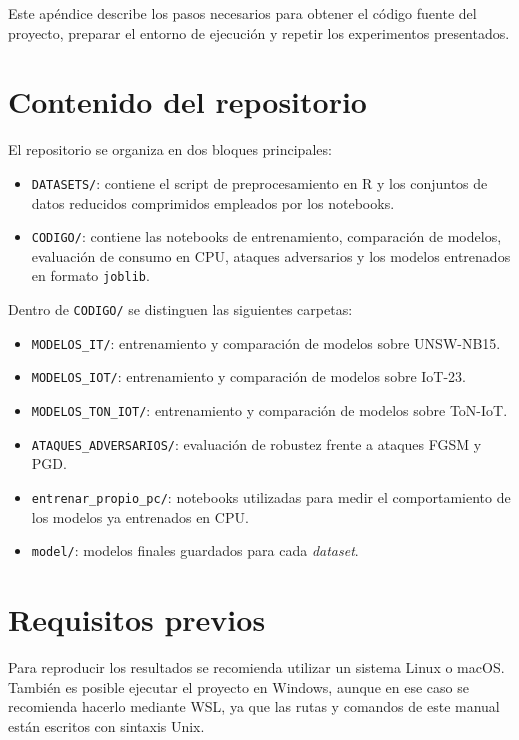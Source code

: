 Este apéndice describe los pasos necesarios para obtener el código fuente del proyecto, preparar el entorno de ejecución y repetir los experimentos presentados.

\section{Contenido del repositorio}

El repositorio se organiza en dos bloques principales:

\begin{itemize}
    \item \texttt{DATASETS/}: contiene el script de preprocesamiento en R y los conjuntos de datos reducidos comprimidos empleados por los notebooks.
    \item \texttt{CODIGO/}: contiene las notebooks de entrenamiento, comparación de modelos, evaluación de consumo en CPU, ataques adversarios y los modelos entrenados en formato \texttt{joblib}.
\end{itemize}

Dentro de \texttt{CODIGO/} se distinguen las siguientes carpetas:

\begin{itemize}
    \item \texttt{MODELOS\_IT/}: entrenamiento y comparación de modelos sobre UNSW-NB15.
    \item \texttt{MODELOS\_IOT/}: entrenamiento y comparación de modelos sobre IoT-23.
    \item \texttt{MODELOS\_TON\_IOT/}: entrenamiento y comparación de modelos sobre ToN-IoT.
    \item \texttt{ATAQUES\_ADVERSARIOS/}: evaluación de robustez frente a ataques FGSM y PGD.
    \item \texttt{entrenar\_propio\_pc/}: notebooks utilizadas para medir el comportamiento de los modelos ya entrenados en CPU.
    \item \texttt{model/}: modelos finales guardados para cada \textit{dataset}.
\end{itemize}

\section{Requisitos previos}

Para reproducir los resultados se recomienda utilizar un sistema Linux o macOS. También es posible ejecutar el proyecto en Windows, aunque en ese caso se recomienda hacerlo mediante WSL, ya que las rutas y comandos de este manual están escritos con sintaxis Unix.

